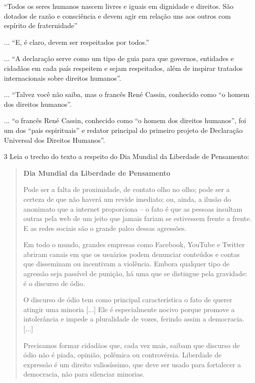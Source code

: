 \begin{escolha}
\begin{escolha}
\begin{escolha}
{{\begin{boxlist}
\boxitem[\rosa{F}] ``Todos os seres humanos nascem livres e iguais em
dignidade e direitos. São dotados de razão e consciência e devem agir 
em relação uns aos outros com espírito de fraternidade''

\boxitem[\rosa{O}] ... ``E, é claro, devem ser respeitados por todos.''

\boxitem[\rosa{O}] ... ``A declaração serve como um tipo de guia para que
governos, entidades e cidadãos em cada país respeitem e sejam respeitados,
além de inspirar tratados internacionais sobre direitos humanos''.

\boxitem[\rosa{O}] ... ``Talvez você não saiba, mas o francês René Cassin,
conhecido como ``o homem dos direitos humanos''.

\boxitem[\rosa{F}] ... ``o francês René Cassin, conhecido como ``o homem 
dos direitos humanos'', foi um dos ``pais espirituais'' e redator principal do
primeiro projeto de Declaração Universal dos Direitos Humanos''.
\end{boxlist}

\num{3} Leia o trecho do texto a respeito do Dia Mundial da Liberdade de
Pensamento:

\begin{quote}
\textbf{Dia Mundial da Liberdade de Pensamento}

Pode ser a falta de proximidade, de contato olho no olho; pode ser a
certeza de que não haverá um revide imediato; ou, ainda, a ilusão do
anonimato que a internet proporciona -- o fato é que as pessoas insultam
outras pela web de um jeito que jamais fariam se estivessem frente a
frente. E as redes sociais são o grande palco dessas agressões.

Em todo o mundo, grandes empresas como Facebook, YouTube e Twitter
abriram canais em que os usuários podem denunciar conteúdos e contas que
disseminam ou incentivam a violência. Embora qualquer tipo de agressão
seja passível de punição, há uma que se distingue pela gravidade: é o
discurso de ódio.

O discurso de ódio tem como principal característica o fato de querer
atingir uma minoria {[}...{]} Ele é especialmente nocivo porque promove
a intolerância e impede a pluralidade de vozes, ferindo assim
a democracia. {[}...{]}

Precisamos formar cidadãos que, cada vez mais, saibam que discurso de
ódio não é piada, opinião, polêmica ou controvérsia. Liberdade de
expressão é um direito valiosíssimo, que deve ser usado para fortalecer
a democracia, não para silenciar minorias.


\end{quote}}}
\end{escolha}
\end{escolha}
\end{escolha}
